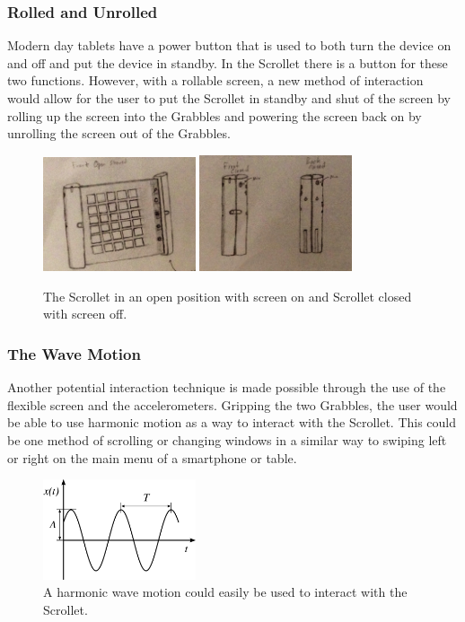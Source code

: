 \documentclass[a4paper]{article}
\begin{document}
\subsubsection{Rolled and Unrolled}
Modern day tablets have a power button that is used to both turn the device on and off and put the device in standby. In the Scrollet there is a button for these two functions. However, with a rollable screen, a new method of interaction would allow for the user to put the Scrollet in standby and shut of the screen by rolling up the screen into the Grabbles and powering the screen back on by unrolling the screen out of the Grabbles.
\begin{figure}[H]
\centering
\includegraphics[width=0.4\textwidth]{scrolletopen.jpg}
\includegraphics[width=0.4\textwidth]{scrolletclosed.jpg}
\caption{The Scrollet in an open position with screen on and Scrollet closed with screen off.}
\end{figure}

\subsubsection{The Wave Motion}
Another potential interaction technique is made possible through the use of the flexible screen and the accelerometers. Gripping the two Grabbles, the user would be able to use harmonic motion as a way to interact with the Scrollet. This could be one method of scrolling or changing windows in a similar way to swiping left or right on the main menu of a smartphone or table.
\begin{figure}[H]
\centering
\includegraphics[width=0.4\textwidth]{harmonicwave.png}
\caption{A harmonic wave motion could easily be used to interact with the Scrollet.}
\end{figure}
\end{document}
